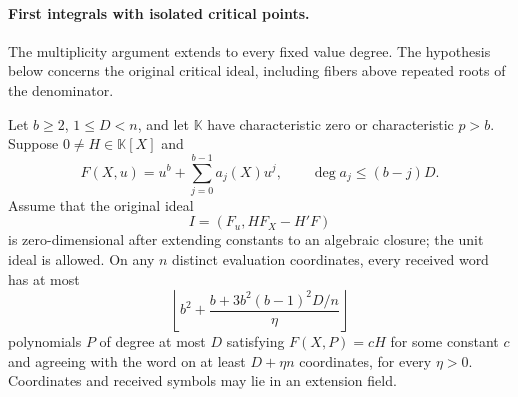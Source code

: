 \paragraph{First integrals with isolated critical points.}
The multiplicity argument extends to every fixed value degree.  The
hypothesis below concerns the original critical ideal, including fibers
above repeated roots of the denominator.

\begin{theorem}\label{thm:general-first-integral-zero-dimensional}
Let $b\ge2$, $1\le D<n$, and let $\mathbb K$ have characteristic zero
or characteristic $p>b$.  Suppose $0\ne H\in\mathbb K[X]$ and
\[
 F(X,u)=u^b+\sum_{j=0}^{b-1}a_j(X)u^j,
 \qquad \deg a_j\le(b-j)D.
\]
Assume that the original ideal
\[
 I=(F_u,HF_X-H'F)
\]
is zero-dimensional after extending constants to an algebraic closure;
the unit ideal is allowed.  On any $n$ distinct evaluation coordinates,
every received word has at most
\[
 \left\lfloor b^2+
 \frac{b+3b^2(b-1)^2D/n}{\eta}\right\rfloor
\]
polynomials $P$ of degree at most $D$ satisfying $F(X,P)=cH$ for some
constant $c$ and agreeing with the word on at least $D+\eta n$
coordinates, for every $\eta>0$.  Coordinates and received symbols may
lie in an extension field.
\end{theorem}

